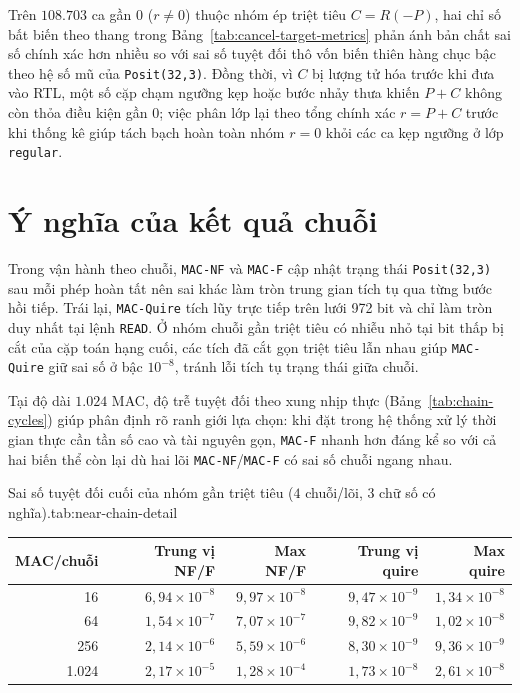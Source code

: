 Trên $108.703$ ca gần $0$ ($r \ne 0$) thuộc nhóm ép triệt tiêu $C = R(-P)$, hai
chỉ số bất biến theo thang trong Bảng~\ref{tab:cancel-target-metrics} phản ánh bản
chất sai số chính xác hơn nhiều so với sai số tuyệt đối thô vốn biến thiên hàng
chục bậc theo hệ số mũ của \texttt{Posit(32,3)}. Đồng thời, vì $C$ bị lượng tử hóa
trước khi đưa vào RTL, một số cặp chạm ngưỡng kẹp hoặc bước nhảy thưa khiến $P+C$
không còn thỏa điều kiện gần $0$; việc phân lớp lại theo tổng chính xác $r = P + C$
trước khi thống kê giúp tách bạch hoàn toàn nhóm $r = 0$ khỏi các ca kẹp ngưỡng
ở lớp \texttt{regular}.

\section{Ý nghĩa của kết quả chuỗi}

Trong vận hành theo chuỗi, \texttt{MAC-NF} và \texttt{MAC-F} cập nhật trạng thái
\texttt{Posit(32,3)} sau mỗi phép hoàn tất nên sai khác làm tròn trung gian tích tụ
qua từng bước hồi tiếp. Trái lại, \texttt{MAC-Quire} tích lũy trực tiếp trên lưới
972 bit và chỉ làm tròn duy nhất tại lệnh \texttt{READ}. Ở nhóm chuỗi gần triệt tiêu
có nhiễu nhỏ tại bit thấp bị cắt của cặp toán hạng cuối, các tích đã cắt gọn triệt
tiêu lẫn nhau giúp \texttt{MAC-Quire} giữ sai số ở bậc $10^{-8}$, tránh lỗi tích tụ
trạng thái giữa chuỗi.

Tại độ dài $1.024$ MAC, độ trễ tuyệt đối theo xung nhịp thực (Bảng~\ref{tab:chain-cycles})
giúp phân định rõ ranh giới lựa chọn: khi đặt trong hệ thống xử lý thời gian thực
cần tần số cao và tài nguyên gọn, \texttt{MAC-F} nhanh hơn đáng kể so với cả hai
biến thể còn lại dù hai lõi \texttt{MAC-NF}/\texttt{MAC-F} có sai số chuỗi ngang nhau.

\begin{engineeringtable}{Sai số tuyệt đối cuối của nhóm gần triệt tiêu ($4$ chuỗi/lõi, 3 chữ số có nghĩa).}{tab:near-chain-detail}
\begin{tabular}{rrrrr}
\toprule
MAC/chuỗi & Trung vị NF/F & Max NF/F & Trung vị quire & Max quire \\
\midrule
16 & $6{,}94{\times}10^{-8}$ & $9{,}97{\times}10^{-8}$ & $9{,}47{\times}10^{-9}$ & $1{,}34{\times}10^{-8}$ \\
64 & $1{,}54{\times}10^{-7}$ & $7{,}07{\times}10^{-7}$ & $9{,}82{\times}10^{-9}$ & $1{,}02{\times}10^{-8}$ \\
256 & $2{,}14{\times}10^{-6}$ & $5{,}59{\times}10^{-6}$ & $8{,}30{\times}10^{-9}$ & $9{,}36{\times}10^{-9}$ \\
1.024 & $2{,}17{\times}10^{-5}$ & $1{,}28{\times}10^{-4}$ & $1{,}73{\times}10^{-8}$ & $2{,}61{\times}10^{-8}$ \\
\bottomrule
\end{tabular}
\end{engineeringtable}

